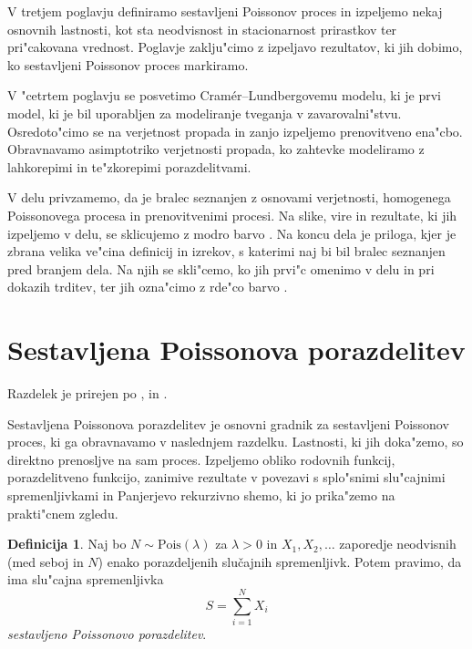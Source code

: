 \documentclass[12pt, a4paper, reqno]{amsart}
\theoremstyle{definition}
\newtheorem{definicija}{Definicija}[section]
\theoremstyle{plain}
\newcommand{\1}{\mathds{1}}
\newcommand{\Pois}[1]{\text{Pois}(#1)}
\begin{document}
    V tretjem poglavju definiramo sestavljeni Poissonov proces in izpeljemo nekaj osnovnih lastnosti, kot sta 
    neodvisnost in stacionarnost prirastkov ter pri"cakovana vrednost. Poglavje zaklju"cimo z izpeljavo rezultatov,
    ki jih dobimo, ko sestavljeni Poissonov proces markiramo.

    V "cetrtem poglavju se posvetimo Cramér--Lundbergovemu modelu, ki je prvi model, ki je bil uporabljen za
    modeliranje tveganja v zavarovalni"stvu. Osredoto"cimo se na verjetnost propada in zanjo izpeljemo prenovitveno
    ena"cbo. Obravnavamo asimptotriko verjetnosti propada, ko zahtevke modeliramo z lahkorepimi in te"zkorepimi
    porazdelitvami.

    V delu privzamemo, da je bralec seznanjen z osnovami verjetnosti, homogenega Poissonovega procesa in prenovitvenimi procesi.
    Na slike, vire in rezultate, ki jih izpeljemo v delu, se sklicujemo z modro barvo .
    Na koncu dela je priloga, kjer je zbrana velika ve"cina definicij in izrekov, s katerimi naj bi bil bralec seznanjen pred branjem dela. Na njih 
    se skli"cemo, ko jih prvi"c omenimo v delu in pri dokazih trditev, ter jih ozna"cimo z rde"co barvo .

    \newpage
\section{Sestavljena Poissonova porazdelitev}

    \noindent
    Razdelek je prirejen po \cite{1}, \cite{2} in  \cite{4}.

    Sestavljena Poissonova porazdelitev je osnovni gradnik za sestavljeni Poissonov proces, ki ga obravnavamo 
    v naslednjem razdelku. Lastnosti, ki jih doka"zemo, so direktno prenosljve na sam proces. Izpeljemo 
    obliko rodovnih funkcij, porazdelitveno funkcijo, zanimive rezultate v povezavi s 
    splo"snimi slu"cajnimi spremenljivkami in Panjerjevo rekurzivno shemo, ki jo prika"zemo na 
    prakti"cnem zgledu.

    \begin{definicija}
        Naj bo $N\sim \Pois{\lambda}$  za $\lambda >0$ in $X_1, X_2, \dots$ zaporedje neodvisnih (med seboj in $N$)
        enako porazdeljenih slučajnih spremenljivk. Potem pravimo, da ima slu"cajna spremenljivka
        \begin{equation*}
            S = \sum_{i=1}^NX_i
        \end{equation*}
        \textit{sestavljeno Poissonovo porazdelitev}. 
        \label{def:sestavljenaPoissonovaPorazdelitev}
    \end{definicija}
\end{document}
